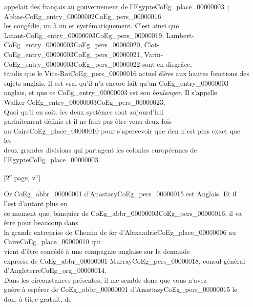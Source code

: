 \documentclass{book}
\begin{document}
appelait des français au gouvernement de l’Egypte\gls{CoEg_place_00000003}~; Abbas-\Gls{CoEg_entry_00000002}\gls{CoEg_pers_00000016}\\
les congédie, un à un et systématiquement. C’est ainsi que\\
Linant-\gls{CoEg_entry_00000003}\gls{CoEg_pers_00000019}, Lambert-\gls{CoEg_entry_00000003}\gls{CoEg_pers_00000020}, Clot-\gls{CoEg_entry_00000003}\gls{CoEg_pers_00000021}, Varin-\gls{CoEg_entry_00000003}\gls{CoEg_pers_00000022} sont en disgrâce,\\
tandis que le Vice-Roi\gls{CoEg_pers_00000016} actuel élève aux hautes fonctions des\\
sujets anglais. Il est vrai qu’il n’a encore fait qu’un \gls{CoEg_entry_00000003}\\
anglais, et que ce \gls{CoEg_entry_00000003} est son \textit{boulanger}. Il s’appelle\\
Walker-\gls{CoEg_entry_00000003}\gls{CoEg_pers_00000023}.\\
\indent Quoi qu’il en soit, les deux systèmes sont aujourd’hui\\
parfaitement définis et il ne faut pas être venu deux fois\\
au Caire\gls{CoEg_place_00000010} pour s’apercevoir que rien n’est plus exact que les\\
deux grandes divisions qui partagent les colonies européennes
de l’Egypte\gls{CoEg_place_00000003}.
{\footnotesize \begin{center} [2\textsuperscript{e} page, v\textsuperscript{o}]\end{center}}
\indent Or \gls{CoEg_abbr_00000001} d’Anastasy\gls{CoEg_pers_00000015} est Anglais. Et il l’est d’autant plus en\\
ce moment que, banquier de \gls{CoEg_abbr_00000003}\gls{CoEg_pers_00000016}, il va être pour beaucoup dans\\
la grande entreprise de Chemin de fer d’Alexandrie\gls{CoEg_place_00000006} au Caire\gls{CoEg_place_00000010} qui\\
vient d’être concédé à une compagnie anglaise sur la demande\\
expresse de \gls{CoEg_abbr_00000001} Murray\gls{CoEg_pers_00000018}, consul-général d’Angleterre\gls{CoEg_org_00000014}.\\
\indent Dans les circonstances présentes, il me semble donc que vous n’avez\\
guère à espérer de \gls{CoEg_abbr_00000001} d’Anastasy\gls{CoEg_pers_00000015} le don, à titre gratuit, de\\
\end{document}
